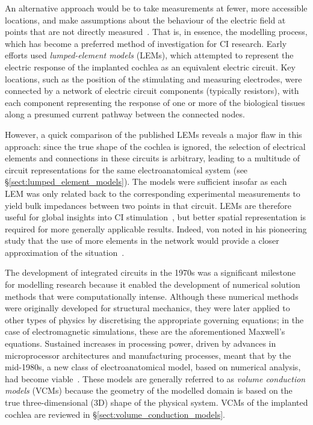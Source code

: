 An alternative approach would be to take measurements at fewer, more accessible
locations, and make assumptions about the behaviour of the electric field at
points that are not directly measured~\cite{kral1998}. That is, in essence, the
modelling process, which has become a preferred method of investigation for CI
research. Early efforts used \emph{lumped-element models} (LEMs), which
attempted to represent the electric response of the implanted cochlea as an
equivalent electric circuit. Key locations, such as the position of the
stimulating and measuring electrodes, were connected by a network of electric
circuit components (typically resistors), with each component representing the
response of one or more of the biological tissues along a presumed current
pathway between the connected nodes.

However, a quick comparison of the published LEMs reveals a major flaw in this
approach: since the true shape of the cochlea is ignored, the selection of
electrical elements and connections in these circuits is arbitrary, leading to a
multitude of circuit representations for the same electroanatomical system (see
\S\ref{sect:lumped_element_models}). The models were sufficient insofar as each
LEM was only related back to the corresponding experimental measurements to
yield bulk impedances between two points in that circuit. LEMs are therefore
useful for global insights into CI
stimulation~\cite{machado1996,briaire2000mesh}, but better spatial
representation is required for more generally applicable results.
Indeed, von \bekesy{} noted in his pioneering study that the use of more
elements in the network would provide a closer approximation of the \invivo{}
situation~\cite{vonbekesy1951}.

The development of integrated circuits in the 1970s was a significant milestone
for modelling research because it enabled the development of numerical solution
methods that were computationally intense. Although these numerical methods were
originally developed for structural mechanics, they were later applied to other
types of physics by discretising the appropriate governing equations; in the
case of electromagnetic simulations, these are the aforementioned Maxwell's
equations. Sustained increases in processing power, driven by advances in
microprocessor architectures and manufacturing processes, meant that by the
mid-1980s, a new class of electroanatomical model, based on numerical analysis,
had become viable~\cite{bondeson2005}. These models are generally referred to as
\emph{volume conduction models} (VCMs) because the geometry of the modelled
domain is based on the true three-dimensional (3D) shape of the physical system.
VCMs of the implanted cochlea are reviewed in
\S\ref{sect:volume_conduction_models}.


